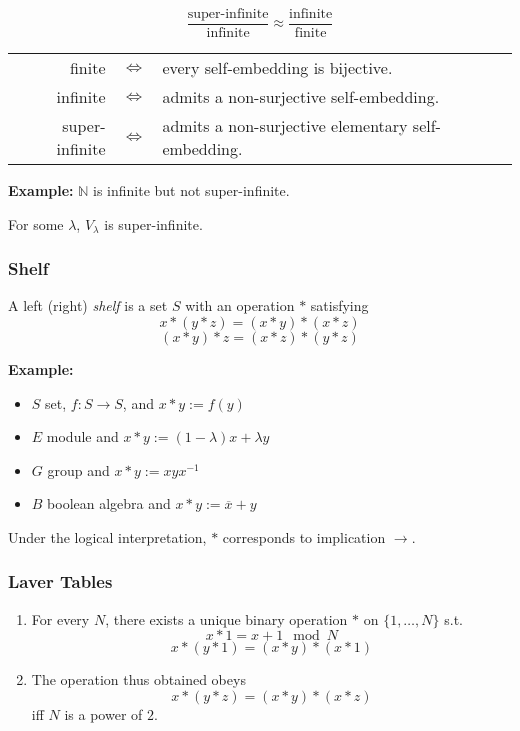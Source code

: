 \documentclass[UTF8,aspectratio=43,11pt,colorlinks,compress,openany]{beamer}%
\begin{document}
\begin{frame}\frametitle{}
\[\dfrac{\text{super-infinite}}{\text{infinite}} \approx \dfrac{\text{infinite}}{\text{finite}}\]
\begin{tabu}{rcl}
finite &$\iff$ &every self-embedding is bijective.\\
infinite &$\iff$ &admits a non-surjective self-embedding.\\
super-infinite &$\iff$ &admits a non-surjective elementary self-embedding.
\end{tabu}
\textbf{Example:} $\mathbb{N}$ is infinite but not super-infinite.
\begin{axiom}[Axiom I3]
For some $\lambda$, $V_\lambda$ is super-infinite.
\end{axiom}
\end{frame}

\begin{frame}\frametitle{Shelf}
\setlength\abovedisplayskip{0pt}
\setlength\belowdisplayskip{0pt}
	\begin{definition}[Shelf]
	A left (right) \emph{shelf} is a set $S$ with an operation $*$ satisfying
	\[x*(y*z)=(x*y)*(x*z)\tag{left self-distributive}\]
	\[(x*y)*z=(x*z)*(y*z)\tag{right self-distributive}\]
	\end{definition}
	\textbf{Example:} 
	\begin{itemize}
		\item $S$ set, $f: S\to S$, and $x*y:=f(y)$
		\item $E$ module and $x*y:=(1-\lambda)x+\lambda y$
		\item $G$ group and $x*y:=xyx^{-1}$
		\item $B$ boolean algebra and $x*y:=\overline{x}+y$
	\end{itemize}
	Under the logical interpretation, $*$ corresponds to implication $\to$.
\end{frame}

\begin{frame}\frametitle{Laver Tables}
	\begin{theorem}[Laver]
	\begin{enumerate}
		\item For every $N$, there exists a unique binary operation $*$ on $\{1,\dots,N\}$ s.t. 
		\[x*1=x+1\mod N\]
		\[x*(y*1)=(x*y)*(x*1)\]
		\item The operation thus obtained obeys
		\[x*(y*z)=(x*y)*(x*z)\]
		iff $N$ is a power of $2$.
	\end{enumerate}
	\end{theorem}
\end{frame}
\end{document}
